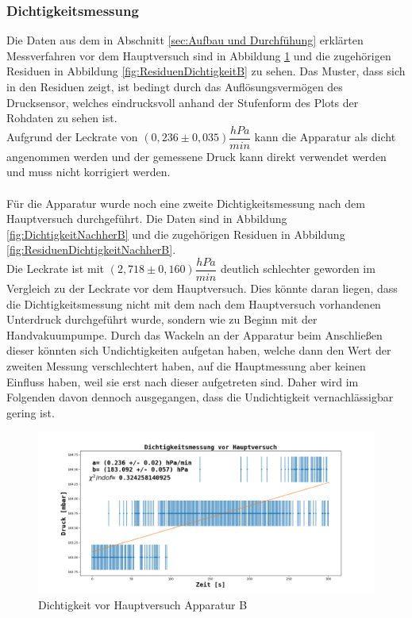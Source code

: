 \documentclass[12pt,a4paper]{article}
\begin{document}
\subsubsection{Dichtigkeitsmessung}
Die Daten aus dem in Abschnitt \ref{sec:Aufbau und Durchfühung} erklärten Messverfahren vor dem Hauptversuch sind in Abbildung \ref{fig:DichtigkeitB} und die zugehörigen Residuen in Abbildung \ref{fig:ResiduenDichtigkeitB} zu sehen. Das Muster, dass sich in den Residuen zeigt, ist bedingt durch das Auflösungsvermögen des Drucksensor, welches eindrucksvoll anhand der Stufenform des Plots der Rohdaten zu sehen ist. \\
Aufgrund der Leckrate von $(0,236 \pm 0,035) \dfrac{hPa}{min}$ kann die Apparatur als dicht angenommen werden und der gemessene Druck kann direkt verwendet werden und muss nicht korrigiert werden.\\
\\Für die Apparatur wurde noch eine zweite Dichtigkeitsmessung nach dem Hauptversuch durchgeführt. Die Daten sind in Abbildung \ref{fig:DichtigkeitNachherB} und die zugehörigen Residuen in Abbildung \ref{fig:ResiduenDichtigkeitNachherB}.\\
Die Leckrate ist mit $(2,718 \pm 0,160) \dfrac{hPa}{min}$ deutlich schlechter geworden im Vergleich zu der Leckrate vor dem Hauptversuch. Dies könnte daran liegen, dass die Dichtigkeitsmessung nicht mit dem nach dem Hauptversuch vorhandenen Unterdruck durchgeführt wurde, sondern wie zu Beginn mit der Handvakuumpumpe. Durch das Wackeln an der Apparatur beim Anschließen dieser könnten sich Undichtigkeiten aufgetan haben, welche dann den Wert der zweiten Messung verschlechtert haben, auf die Hauptmessung aber keinen Einfluss haben, weil sie erst nach dieser aufgetreten sind. Daher wird im Folgenden davon dennoch ausgegangen, dass die Undichtigkeit vernachlässigbar gering ist.

\begin{figure}
\includegraphics[width=\linewidth]{Bilder/Dichtigkeit_vorher_B.png}
\caption[Dichtigkeit vor Hauptversuch Apparatur B]{Dichtigkeit vor Hauptversuch Apparatur B}
\label{fig:DichtigkeitB}
\end{figure}
\end{document}
